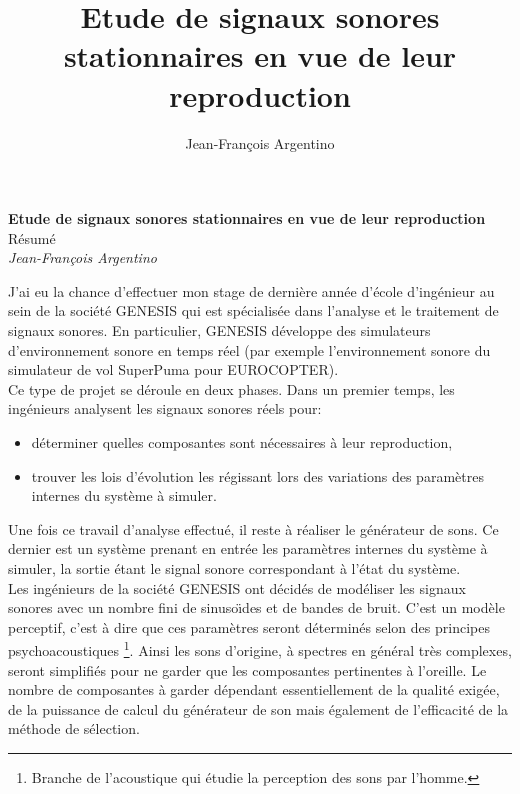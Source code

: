 \documentclass[12pt,a4paper,french]{article}
\title{Etude de signaux sonores stationnaires en vue de leur reproduction}
\author{Jean-Fran\c{c}ois Argentino}
\begin{document}
\sloppy


\begin{center}
\textbf{\large{Etude de signaux sonores stationnaires en vue de
leur reproduction}}\\
R{\'e}sum{\'e}\\
\medskip
\emph{Jean-Fran\c{c}ois Argentino}\\
\end{center}
\bigskip

J'ai eu la chance d'effectuer mon stage de derni{\`e}re ann{\'e}e d'{\'e}cole
d'ing{\'e}nieur au sein de la soci{\'e}t{\'e} GENESIS qui est sp{\'e}cialis{\'e}e dans
l'analyse et le traitement de signaux sonores. En particulier,
GENESIS d{\'e}veloppe des simulateurs d'environnement sonore en temps
r{\'e}el (par exemple l'environnement sonore du simulateur de vol
SuperPuma pour EUROCOPTER).\\

Ce type de projet se d{\'e}roule en deux phases. Dans un premier
temps, les ing{\'e}nieurs analysent les signaux sonores r{\'e}els pour:
\begin{itemize}
    \item d{\'e}terminer quelles composantes sont n{\'e}cessaires {\`a} leur
    reproduction,
    \item trouver les lois d'{\'e}volution les r{\'e}gissant lors des
    variations des param{\`e}tres internes du syst{\`e}me {\`a} simuler.
\end{itemize}

Une fois ce travail d'analyse effectu{\'e}, il reste {\`a} r{\'e}aliser le
g{\'e}n{\'e}rateur de sons. Ce dernier est un syst{\`e}me prenant en entr{\'e}e
les param{\`e}tres internes du syst{\`e}me {\`a} simuler, la sortie {\'e}tant le
signal sonore correspondant {\`a} l'{\'e}tat du syst{\`e}me.\\

Les ing{\'e}nieurs de la soci{\'e}t{\'e} GENESIS ont d{\'e}cid{\'e}s de mod{\'e}liser les
signaux sonores avec un nombre fini de sinuso{\"\i}des et de bandes de
bruit. C'est un mod{\`e}le perceptif, c'est {\`a} dire que ces param{\`e}tres
seront d{\'e}termin{\'e}s selon des principes psychoacoustiques
\footnote{Branche de l'acoustique qui {\'e}tudie la perception des
sons par l'homme.}. Ainsi les sons d'origine, {\`a} spectres en
g{\'e}n{\'e}ral tr{\`e}s complexes, seront simplifi{\'e}s pour ne garder que les
composantes pertinentes {\`a} l'oreille. Le nombre de composantes {\`a}
garder d{\'e}pendant essentiellement de la qualit{\'e} exig{\'e}e, de la
puissance de calcul du g{\'e}n{\'e}rateur de son mais {\'e}galement de
l'efficacit{\'e} de la m{\'e}thode de
s{\'e}lection.\\
\end{document}
